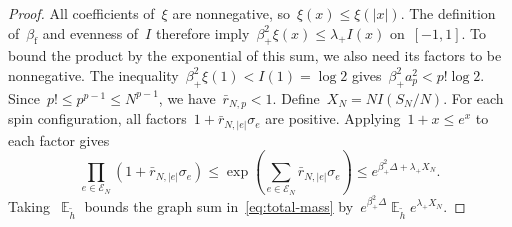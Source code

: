 \documentclass[letterpaper,11pt,reqno]{amsart}
\renewcommand{\leq}{\leqslant}
\DeclareMathOperator{\E}{\mathds{E}}
\begin{document}
\begin{proof}
All coefficients of~$\xi$ are nonnegative, so~$\xi(x)\leq\xi(|x|)$. The definition of~$\beta_{\mathrm f}$ and evenness of~$I$ therefore imply~$\beta_+^2\xi(x)\leq\lambda_+I(x)$ on~$[-1,1]$. To bound the product by the exponential of this sum, we also need its factors to be nonnegative. The inequality~$\beta_+^2\xi(1)<I(1)=\log2$ gives~$\beta_+^2a_p^2<p!\log2$. Since~$p!\leq p^{p-1}\leq N^{p-1}$, we have~$\bar r_{N,p}<1$. Define~$X_N=NI(S_N/N)$. For each spin configuration, all factors~$1+\bar r_{N,|e|}\sigma_e$ are positive. Applying~$1+x\leq e^x$ to each factor gives
\begin{equation*}
\prod_{e\in\mathcal E_N}(1+\bar r_{N,|e|}\sigma_e)
\leq\exp\!\left(\sum_{e\in\mathcal E_N}\bar r_{N,|e|}\sigma_e\right)
\leq e^{\beta_+^2\Delta+\lambda_+X_N}.
\end{equation*}
Taking~$\E_{\widetilde h}$ bounds the graph sum in~\eqref{eq:total-mass} by~$e^{\beta_+^2\Delta}\E_{\widetilde h}e^{\lambda_+X_N}$.


\end{proof}
\end{document}
